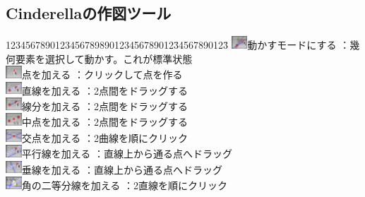 \documentclass[papersize,a4paper,12pt,uplatex]{jsarticle}
\begin{document}
\hypertarget{geometrytool}{}
\subsection{Cinderellaの作図ツール}
 \begin{tabbing}
1234567890123456789890123456789012\=34567890123\=\kill
\includegraphics[bb=0 0 6.48 5.04 , width=0.6cm]{Fig/move.pdf}動かすモードにする \>：幾何要素を選択して動かす。これが標準状態\\
\includegraphics[bb=0 0 6.48 5.04 , width=0.6cm]{Fig/single-add.pdf}点を加える \>：クリックして点を作る\\
\includegraphics[bb=0 0 6.48 5.04 , width=0.6cm]{Fig/multi-add-line.pdf}直線を加える \>：2点間をドラッグする\\
\includegraphics[bb=0 0 6.48 5.04 , width=0.6cm]{Fig/segment.pdf}線分を加える \>：2点間をドラッグする\\
\includegraphics[bb=0 0 6.48 5.04 , width=0.6cm]{Fig/middle.pdf}中点を加える \>：2点間をドラッグする\\
\includegraphics[bb=0 0 6.48 5.04 , width=0.6cm]{Fig/intersection.pdf}交点を加える \>：2曲線を順にクリック\\
\includegraphics[bb=0 0 6.48 5.04 , width=0.6cm]{Fig/multi-add-parallel.pdf}平行線を加える \>：直線上から通る点へドラッグ\\
\includegraphics[bb=0 0 6.48 5.04 , width=0.6cm]{Fig/multi-add-perp.pdf}垂線を加える \>：直線上から通る点へドラッグ\\
\includegraphics[bb=0 0 6.48 5.04 , width=0.6cm]{Fig/bisector.pdf}角の二等分線を加える \>：2直線を順にクリック\\

\end{tabbing}
\end{document}
